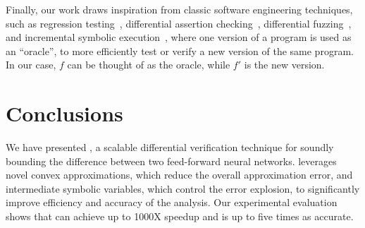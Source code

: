 Finally, our work draws inspiration from classic software engineering
techniques, such as regression testing~\cite{rothermel1997safe},
differential assertion checking~\cite{lahiri2013differential},
differential fuzzing~\cite{NilizadehNP19}, and incremental symbolic
execution~\cite{Person11,GuoKW16}, where one version of a program is
used as an ``oracle'', to more efficiently test or verify a new
version of the same program.  In our case, $ f $ can be thought of as
the oracle, while $ f' $ is the new version.


\section{Conclusions}
\label{neurodiff:sec:conclusion}

We have presented \Name{}, a scalable differential verification
technique for soundly bounding the difference between two feed-forward
neural networks. \Name{} leverages novel convex approximations, which
reduce the overall approximation error, and intermediate symbolic
variables, which control the error explosion, to significantly improve
efficiency and accuracy of the analysis. Our experimental evaluation
shows that \Name{} can achieve up to 1000X speedup and is up to five
times as accurate.


